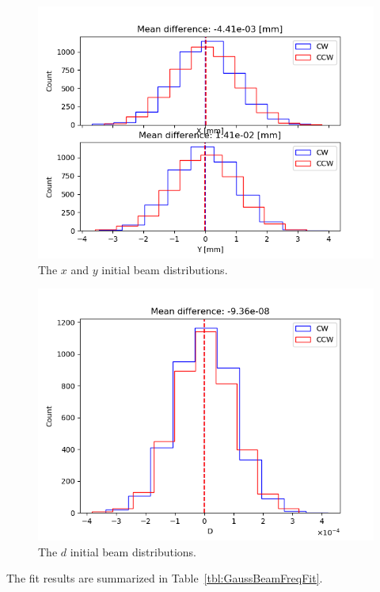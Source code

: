\documentclass{article}
\begin{document}
\begin{figure}[!h]
  \centering
  \includegraphics[width=\linewidth]{img/spin_axis_motion/presentation/beam_histograms_XY}
  \caption{The $x$ and $y$ initial beam distributions.\label{fig:Gauss_hists_XY}}
\end{figure}
\begin{figure}[!h]
  \centering
  \includegraphics[width=\linewidth]{img/spin_axis_motion/presentation/beam_histograms_D}
  \caption{The $d$ initial beam distributions.\label{fig:Gauss_hists_D}}
\end{figure}

The fit results are summarized in Table~\ref{tbl:GaussBeamFreqFit}.
\end{document}
